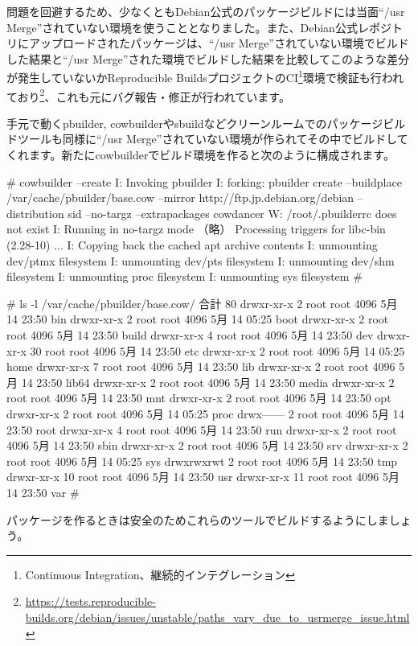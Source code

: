 \documentclass[mingoth,a4paper]{jsarticle}
\begin{document}
問題を回避するため、少なくともDebian公式のパッケージビルドには当面``/usr Merge''されていない環境を使うこととなりました。また、Debian公式レポジトリにアップロードされたパッケージは、``/usr Merge''されていない環境でビルドした結果と``/usr Merge''された環境でビルドした結果を比較してこのような差分が発生していないかReproducible BuildsプロジェクトのCI\footnote{Continuous Integration、継続的インテグレーション}環境で検証も行われており\footnote{\url{https://tests.reproducible-builds.org/debian/issues/unstable/paths_vary_due_to_usrmerge_issue.html}}、これも元にバグ報告・修正が行われています。

手元で動くpbuilder, cowbuilderやsbuildなどクリーンルームでのパッケージビルドツールも同様に``/usr Merge''されていない環境が作られてその中でビルドしてくれます。新たにcowbuilderでビルド環境を作ると次のように構成されます。

\begin{commandline}
# cowbuilder --create
I: Invoking pbuilder
I: forking: pbuilder create --buildplace /var/cache/pbuilder/base.cow --mirror http://ftp.jp.debian.org/debian 
  --distribution sid --no-targz --extrapackages cowdancer
W: /root/.pbuilderrc does not exist
I: Running in no-targz mode
（略）
Processing triggers for libc-bin (2.28-10) ...
I: Copying back the cached apt archive contents
I: unmounting dev/ptmx filesystem
I: unmounting dev/pts filesystem
I: unmounting dev/shm filesystem
I: unmounting proc filesystem
I: unmounting sys filesystem
# 
\end{commandline}
\begin{commandline}
# ls -l /var/cache/pbuilder/base.cow/
合計 80
drwxr-xr-x  2 root root 4096  5月 14 23:50 bin
drwxr-xr-x  2 root root 4096  5月 14 05:25 boot
drwxr-xr-x  2 root root 4096  5月 14 23:50 build
drwxr-xr-x  4 root root 4096  5月 14 23:50 dev
drwxr-xr-x 30 root root 4096  5月 14 23:50 etc
drwxr-xr-x  2 root root 4096  5月 14 05:25 home
drwxr-xr-x  7 root root 4096  5月 14 23:50 lib
drwxr-xr-x  2 root root 4096  5月 14 23:50 lib64
drwxr-xr-x  2 root root 4096  5月 14 23:50 media
drwxr-xr-x  2 root root 4096  5月 14 23:50 mnt
drwxr-xr-x  2 root root 4096  5月 14 23:50 opt
drwxr-xr-x  2 root root 4096  5月 14 05:25 proc
drwx------  2 root root 4096  5月 14 23:50 root
drwxr-xr-x  4 root root 4096  5月 14 23:50 run
drwxr-xr-x  2 root root 4096  5月 14 23:50 sbin
drwxr-xr-x  2 root root 4096  5月 14 23:50 srv
drwxr-xr-x  2 root root 4096  5月 14 05:25 sys
drwxrwxrwt  2 root root 4096  5月 14 23:50 tmp
drwxr-xr-x 10 root root 4096  5月 14 23:50 usr
drwxr-xr-x 11 root root 4096  5月 14 23:50 var
#
\end{commandline}
パッケージを作るときは安全のためこれらのツールでビルドするようにしましょう。
\end{document}
